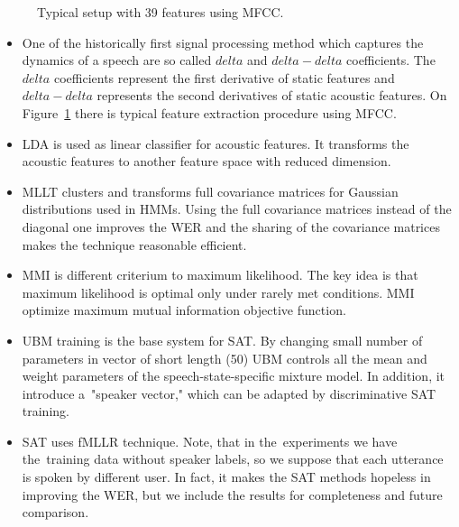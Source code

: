 {\begin{figure}
    \begin{center}
    
    \caption{Typical setup with 39 features using \ac{MFCC}.}
    \label{fig:delta} 
    \end{center}
\end{figure}

\begin{itemize}
    \item {} 
        One of the historically first signal processing method which captures the dynamics of a speech
        are so called $delta$ and $delta-delta$ coefficients. The~$delta$ coefficients represent the first 
        derivative of static features and $delta-delta$ represents the second derivatives of static acoustic features.
        On Figure~\ref{fig:delta} there is typical feature extraction procedure using \ac{MFCC}\cite{ye2004speech}.
    \item \ac{LDA} is used as linear classifier for acoustic features. 
        It transforms the acoustic features to another feature space with reduced dimension.
    \item \ac{MLLT}\cite{psutka2007benefit} clusters and transforms full covariance matrices for Gaussian distributions used in \ac{HMM}s. Using the full covariance matrices instead of the diagonal one improves the \ac{WER} and the sharing of the covariance matrices makes the technique reasonable efficient.
    \item \ac{MMI} is different criterium to maximum likelihood. The key idea is that maximum likelihood is optimal only under rarely met conditions. \ac{MMI} optimize maximum mutual information objective function\cite{chow1990maximum}.
    \item \ac{UBM}\cite{povey2010subspace} training is the base system for \acl{SAT}. 
        By changing small number of parameters in vector of short length (50) \ac{UBM} controls all the mean and 
        weight parameters of the speech-state-specific mixture model. In addition, it introduce 
        a~"speaker vector," which can be adapted by discriminative \ac{SAT} training.
    \item \acl{SAT}\cite{povey2011kaldi} uses \ac{fMLLR} technique. Note, that in the~experiments we have 
        the~training data without speaker labels, so we suppose that each utterance is spoken by different user.
        In fact, it makes the \ac{SAT} methods hopeless in improving the \ac{WER}, 
        but we include the results for completeness and future comparison.

\end{itemize}}
